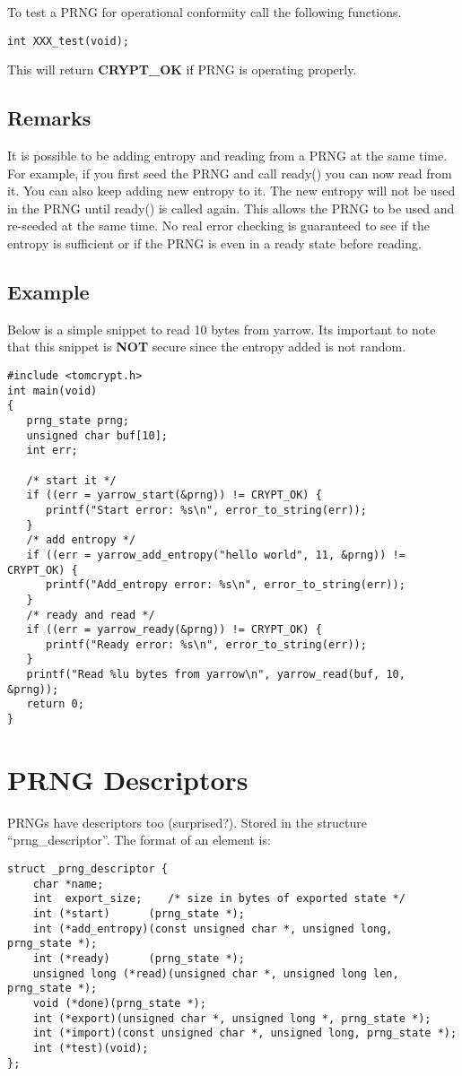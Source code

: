 \documentclass[a4paper]{book}
\begin{document}
To test a PRNG for operational conformity call the following functions.

\begin{verbatim}
int XXX_test(void);
\end{verbatim}

This will return \textbf{CRYPT\_OK} if PRNG is operating properly.

\subsection{Remarks}

It is possible to be adding entropy and reading from a PRNG at the same time.  For example, if you first seed the PRNG
and call ready() you can now read from it.  You can also keep adding new entropy to it.  The new entropy will not be used
in the PRNG until ready() is called again.  This allows the PRNG to be used and re-seeded at the same time.  No real error 
checking is guaranteed to see if the entropy is sufficient or if the PRNG is even in a ready state before reading.

\subsection{Example}

Below is a simple snippet to read 10 bytes from yarrow.  Its important to note that this snippet is 
{\bf NOT} secure since the entropy added is not random.

\begin{verbatim}
#include <tomcrypt.h>
int main(void)
{
   prng_state prng;
   unsigned char buf[10];
   int err;
   
   /* start it */
   if ((err = yarrow_start(&prng)) != CRYPT_OK) {
      printf("Start error: %s\n", error_to_string(err));
   }
   /* add entropy */
   if ((err = yarrow_add_entropy("hello world", 11, &prng)) != CRYPT_OK) {
      printf("Add_entropy error: %s\n", error_to_string(err));
   }
   /* ready and read */
   if ((err = yarrow_ready(&prng)) != CRYPT_OK) {
      printf("Ready error: %s\n", error_to_string(err));
   }
   printf("Read %lu bytes from yarrow\n", yarrow_read(buf, 10, &prng));
   return 0;
}
\end{verbatim}

\section{PRNG Descriptors}
PRNGs have descriptors too (surprised?). Stored in the structure ``prng\_descriptor''.  The format of an element is:
\begin{verbatim}
struct _prng_descriptor {
    char *name;
    int  export_size;    /* size in bytes of exported state */
    int (*start)      (prng_state *);
    int (*add_entropy)(const unsigned char *, unsigned long, prng_state *);
    int (*ready)      (prng_state *);
    unsigned long (*read)(unsigned char *, unsigned long len, prng_state *);
    void (*done)(prng_state *);
    int (*export)(unsigned char *, unsigned long *, prng_state *);
    int (*import)(const unsigned char *, unsigned long, prng_state *);
    int (*test)(void);
};
\end{verbatim}
\end{document}
